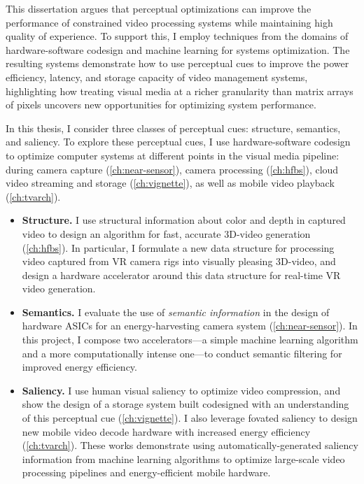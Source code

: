 This dissertation argues that perceptual optimizations can improve the performance of constrained video processing systems while maintaining high quality of experience.
To support this, I employ techniques from the domains of hardware-software codesign and machine learning for systems optimization.
The resulting systems demonstrate how to use perceptual cues to improve the power efficiency, latency, and storage capacity of video management systems, highlighting how treating visual media at a richer granularity than matrix arrays of pixels uncovers new opportunities for optimizing system performance.

In this thesis, I consider three classes of perceptual cues: structure, semantics, and saliency. To explore these perceptual cues, I use hardware-software codesign to optimize computer systems at different points in the visual media pipeline: during camera capture (\ref{ch:near-sensor}), camera processing (\ref{ch:hfbs}), cloud video streaming and storage (\ref{ch:vignette}), as well as mobile video playback (\ref{ch:tvarch}).

\begin{itemize}
\item \textbf{Structure.} I use structural information about color and depth in captured video to design an algorithm for fast, accurate 3D-\threesixty video generation (\ref{ch:hfbs}).
In particular, I formulate a new data structure for processing video captured from VR camera rigs into visually pleasing 3D-\threesixty video, and design a hardware accelerator around this data structure for real-time VR video generation.

\item \textbf{Semantics.} I evaluate the use of \emph{semantic information} in the design of hardware ASICs for an energy-harvesting camera system (\ref{ch:near-sensor}).
In this project, I compose two accelerators---a simple machine learning algorithm and a more computationally intense one---to conduct semantic filtering for improved energy efficiency.

\item \textbf{Saliency.} I use human visual saliency to optimize video compression, and show the design of a storage system built codesigned with an understanding of this perceptual cue (\ref{ch:vignette}).
I also leverage fovated saliency to design new mobile video decode hardware with increased energy efficiency (\ref{ch:tvarch}).
These works demonstrate using automatically-generated saliency information from machine learning algorithms to optimize large-scale video processing pipelines and energy-efficient mobile hardware.
\end{itemize}


